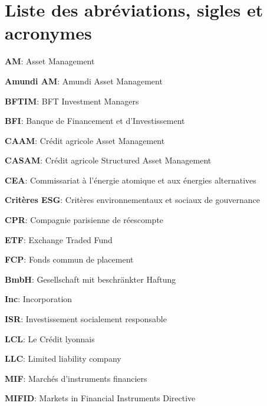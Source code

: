 \chapter*{Liste des abréviations, sigles et acronymes}
\par \textbf{AM}: Asset Management \\
\par \textbf{Amundi AM}: Amundi Asset Management \\
\par \textbf{BFTIM}: BFT Investment Managers \\
\par \textbf{BFI}: Banque de Financement et d'Investissement \\
\par \textbf{CAAM}: Crédit agricole Asset Management \\
\par \textbf{CASAM}: Crédit agricole Structured Asset Management \\
\par \textbf{CEA}: Commissariat à l'énergie atomique et aux énergies alternatives\\
\par \textbf{Critères ESG}: Critères environnementaux et sociaux de gouvernance\\
\par \textbf{CPR}: Compagnie parisienne de réescompte \\
\par \textbf{ETF}: Exchange Traded Fund \\
\par \textbf{FCP}: Fonds commun de placement \\
\par \textbf{BmbH}: Gesellschaft mit beschränkter Haftung \\
\par \textbf{Inc}: Incorporation \\
\par \textbf{ISR}: Investissement socialement responsable \\
\par \textbf{LCL}: Le Crédit lyonnais \\
\par \textbf{LLC}: Limited liability company \\
\par \textbf{MIF}: Marchés d'instruments financiers \\
\par \textbf{MIFID}: Markets in Financial Instruments Directive \\
